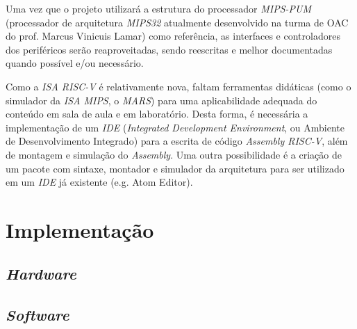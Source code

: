 \documentclass{article}
\begin{document}
    {Uma vez que o projeto utilizará a estrutura do processador \textit{MIPS-PUM} (processador de arquitetura \textit{MIPS32} atualmente desenvolvido na turma de OAC do prof. Marcus Vinicuis Lamar) como referência, as interfaces e controladores dos periféricos serão reaproveitadas, sendo reescritas e melhor documentadas quando possível e/ou necessário.}

    {Como a \textit{ISA RISC-V} é relativamente nova, faltam ferramentas didáticas (como o simulador da \textit{ISA MIPS}, o \textit{MARS}) para uma aplicabilidade adequada do conteúdo em sala de aula e em laboratório. Desta forma, é necessária a implementação de um \textit{IDE} (\textit{Integrated Development Environment}, ou Ambiente de Desenvolvimento Integrado) para a escrita de código \textit{Assembly RISC-V}, além de montagem e simulação do \textit{Assembly}. Uma outra possibilidade é a criação de um pacote com sintaxe, montador e simulador da arquitetura para ser utilizado em um \textit{IDE} já existente (e.g. Atom Editor).}


\section{Implementação}

\subsection{\textit{Hardware}}


\subsection{\textit{Software}}
\end{document}
